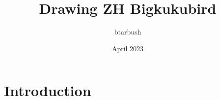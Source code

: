 \documentclass{article}
\title{Drawing ZH Bigkukubird}
\author{btarbush }
\date{April 2023}
\begin{document}
\maketitle

\section{Introduction}
\end{document}
